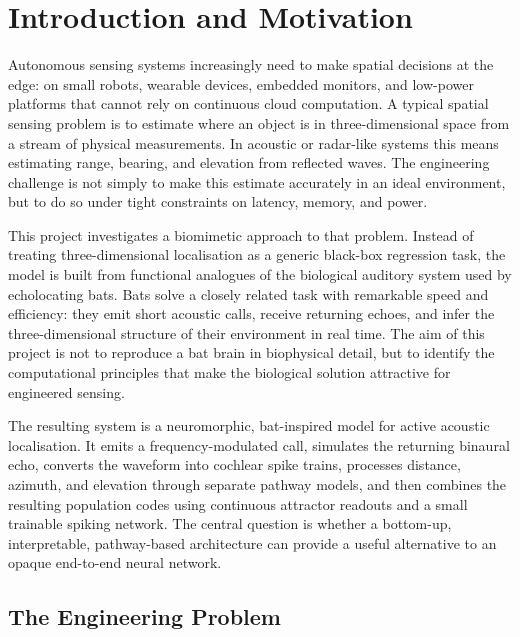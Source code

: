 \chapter{Introduction and Motivation}


Autonomous sensing systems increasingly need to make spatial decisions at the edge: on small robots, wearable devices, embedded monitors, and low-power platforms that cannot rely on continuous cloud computation. A typical spatial sensing problem is to estimate where an object is in three-dimensional space from a stream of physical measurements. In acoustic or radar-like systems this means estimating range, bearing, and elevation from reflected waves. The engineering challenge is not simply to make this estimate accurately in an ideal environment, but to do so under tight constraints on latency, memory, and power.



This project investigates a biomimetic approach to that problem. Instead of treating three-dimensional localisation as a generic black-box regression task, the model is built from functional analogues of the biological auditory system used by echolocating bats. Bats solve a closely related task with remarkable speed and efficiency: they emit short acoustic calls, receive returning echoes, and infer the three-dimensional structure of their environment in real time. The aim of this project is not to reproduce a bat brain in biophysical detail, but to identify the computational principles that make the biological solution attractive for engineered sensing.

The resulting system is a neuromorphic, bat-inspired model for active acoustic localisation. It emits a frequency-modulated call, simulates the returning binaural echo, converts the waveform into cochlear spike trains, processes distance, azimuth, and elevation through separate pathway models, and then combines the resulting population codes using continuous attractor readouts and a small trainable spiking network. The central question is whether a bottom-up, interpretable, pathway-based architecture can provide a useful alternative to an opaque end-to-end neural network.

\section{The Engineering Problem}

